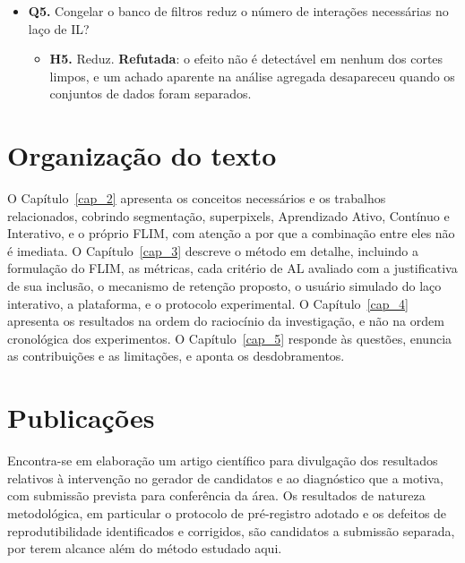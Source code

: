 \begin{itemize}
\item \textbf{Q5.} Congelar o banco de filtros reduz o número de interações necessárias no laço de \ac{IL}?
\begin{itemize}
\item \textbf{H5.} Reduz. \textbf{Refutada}: o efeito não é detectável em nenhum dos cortes limpos, e um achado aparente na análise agregada desapareceu quando os conjuntos de dados foram separados.
\end{itemize}

\end{itemize}

\section{Organização do texto}

O Capítulo~\ref{cap_2} apresenta os conceitos necessários e os trabalhos relacionados, cobrindo segmentação, superpixels, Aprendizado Ativo, Contínuo e Interativo, e o próprio \ac{FLIM}, com atenção a por que a combinação entre eles não é imediata. O Capítulo~\ref{cap_3} descreve o método em detalhe, incluindo a formulação do \ac{FLIM}, as métricas, cada critério de \ac{AL} avaliado com a justificativa de sua inclusão, o mecanismo de retenção proposto, o usuário simulado do laço interativo, a plataforma, e o protocolo experimental. O Capítulo~\ref{cap_4} apresenta os resultados na ordem do raciocínio da investigação, e não na ordem cronológica dos experimentos. O Capítulo~\ref{cap_5} responde às questões, enuncia as contribuições e as limitações, e aponta os desdobramentos.

\section{Publicações}

Encontra-se em elaboração um artigo científico para divulgação dos resultados relativos à intervenção no gerador de candidatos e ao diagnóstico que a motiva, com submissão prevista para conferência da área. Os resultados de natureza metodológica, em particular o protocolo de pré-registro adotado e os defeitos de reprodutibilidade identificados e corrigidos, são candidatos a submissão separada, por terem alcance além do método estudado aqui.
